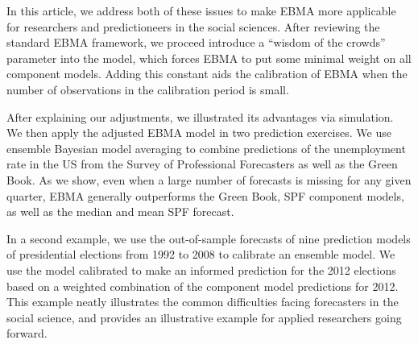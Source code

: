 \documentclass[12pt,fullpage,endnotes]{article}
\begin{document}
In this article, we address both of these issues to make EBMA more
applicable for researchers and predictioneers in the social
sciences. After reviewing the standard EBMA framework, we proceed
introduce a ``wisdom of the crowds'' parameter into the model, which
forces EBMA to put some minimal weight on all component models. Adding
this constant aids the calibration of EBMA when the number of
observations in the calibration period is small.

After explaining our adjustments, we illustrated its advantages via
simulation.  We then apply the adjusted EBMA model in two prediction
exercises. We use ensemble Bayesian model averaging to combine
predictions of the unemployment rate in the US from the Survey of
Professional Forecasters as well as the Green Book. As we show, even
when a large number of forecasts is missing for any given quarter,
EBMA generally outperforms the Green Book, SPF component models, as
well as the median and mean SPF forecast.

In a second example, we use the out-of-sample forecasts of nine
prediction models of presidential elections from 1992 to 2008 to
calibrate an ensemble model. We use the model calibrated to make an
informed prediction for the 2012 elections based on a weighted
combination of the component model predictions for 2012. This example
neatly illustrates the common difficulties facing forecasters in the
social science, and provides an illustrative example for applied
researchers going forward.
\end{document}
